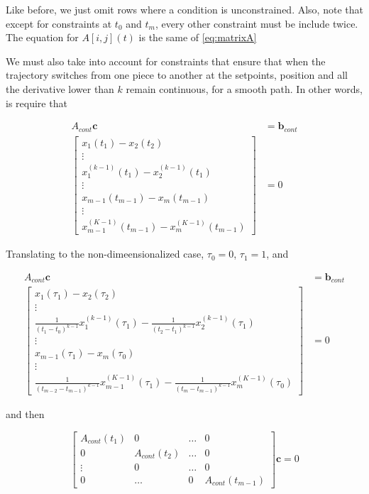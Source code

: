 \noindent Like before, we just omit rows where a condition is unconstrained. Also, note that except for constraints at $t_0$ and $t_m$, every other constraint must be include twice. The equation for $A[i,j](t)$ is the same of \eqref{eq:matrixA}

\noindent We must also take into account for constraints that ensure that when the trajectory switches from one piece to another at the setpoints, position and all the derivative lower than $k$ remain continuous, for a smooth path. In other words, is require that

\begin{align}
	A_{cont}\mathbf{c} &= \mathbf{b}_{cont} \\
	\begin{bmatrix}
		x_1(t_1)-x_2(t_2) 							  \\
		\vdots            							  \\
		x_1^{(k-1)}(t_1)-x_2^{(k-1)}(t_1) 			  \\
		\vdots                                        \\
		x_{m-1}(t_{m-1})-x_m(t_{m-1})                 \\
		\vdots                                        \\
		x_{m-1}^{(K-1)}(t_{m-1})-x_m^{(K-1)}(t_{m-1})
	\end{bmatrix} 
	&= 0 \nonumber
\end{align}

\noindent Translating to the non-dimeensionalized case, $\tau_0=0$, $\tau_1=1$, and

\begin{align}
	A_{cont}\mathbf{c} &= \mathbf{b}_{cont} \\
	\begin{bmatrix}
		x_1(\tau_1)-x_2(\tau_2) \\
		\vdots \\
		\frac{1}{(t_1-t_0)^{k-1}}x_1^{(k-1)}(\tau_1)-\frac{1}{(t_2-t_1)^{k-1}}x_2^{(k-1)}(\tau_1) \\
		\vdots \\
		x_{m-1}(\tau_1)-x_m(\tau_0) \\
		\vdots \\
		\frac{1}{(t_{m-2}-t_{m-1})^{k-1}}x_{m-1}^{(K-1)}(\tau_1)-\frac{1}{(t_m-t_{m-1})^{k-1}}x_m^{(K-1)}(\tau_0)
	\end{bmatrix}
	&= 0 \nonumber
\end{align}

\noindent and then

\begin{equation}
	\begin{bmatrix}
		A_{cont}(t_1) & 0             & \dots & 0 \\
		0             & A_{cont}(t_2) &	\dots & 0 \\
		\vdots        & 0             & \dots & 0 \\
		0             & \dots         & 0     & A_{cont}(t_{m-1})  
	\end{bmatrix}
	\mathbf{c}=0
\end{equation}

